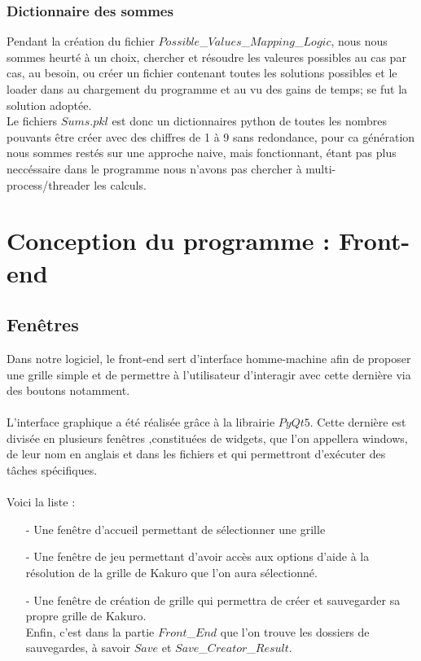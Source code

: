 \documentclass[french,12pt]{article}
\begin{document}
\subsubsection{Dictionnaire des sommes}

Pendant la création du fichier $Possible$\_$Values$\_$Mapping$\_$Logic$, nous nous sommes heurté à un choix, chercher et résoudre les valeures possibles au cas par cas, au besoin, ou créer un fichier contenant toutes les solutions possibles et le loader dans au chargement du programme et au vu des gains de temps; se fut la solution adoptée.\\

Le fichiers $Sums.pkl$ est donc un dictionnaires python de toutes les nombres pouvants être créer avec des chiffres de 1 à 9 sans redondance, pour ca génération nous sommes restés sur une approche naive, mais fonctionnant, étant pas plus neccéssaire dans le programme nous n'avons pas chercher à multi- process/threader les calculs.





\newpage
\section{Conception du programme : Front-end}
\subsection{Fenêtres}
Dans notre logiciel, le front-end sert d'interface homme-machine afin de proposer une grille simple et de permettre à l'utilisateur d'interagir avec cette dernière via des boutons notamment. \\ \\
L'interface graphique a été réalisée grâce à la librairie $PyQt5$. Cette dernière est divisée en plusieurs fenêtres ,constituées de widgets, que l'on appellera windows, de leur nom en anglais et dans les fichiers et qui permettront d'exécuter des tâches spécifiques. \\ \\
Voici la liste : \\

\begin{enumerate}
	\item[-] Une fenêtre d'accueil permettant de sélectionner une grille  \\
	\item[-] Une fenêtre de jeu permettant d'avoir accès aux options d'aide à la 				résolution de la grille de Kakuro que l'on aura sélectionné. \\
	\item[-] Une fenêtre de création de grille qui permettra de créer et sauvegarder sa 		propre grille de Kakuro. \\
	Enfin, c'est dans la partie $Front$\_$End$ que l'on trouve les dossiers de 					sauvegardes, à savoir $Save$ et $Save$\_$Creator$\_$Result$. \\
\end{enumerate}
\end{document}

